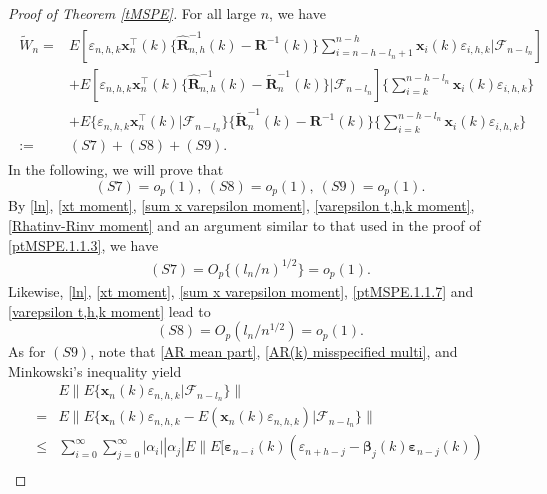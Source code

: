\documentclass[ejsv2]{imsart}
\theoremstyle{plain}
\theoremstyle{definition}
\theoremstyle{remark}
\begin{document}
\begin{proof}[Proof of Theorem \ref{tMSPE}]
{For all large $n$, we have
\begin{align}\label{ptMSPE.1.2.1}
\begin{split}
   \tilde{W}_n=  & E[\varepsilon_{n,h,k}\mathbf{x}^\top_n(k)\{\hat{\mathbf{R}}_{n,h}^{-1}(k)-\mathbf{R}^{-1}(k)\}\sum_{i=n-h-l_n+1}^{n-h}\mathbf{x}_i(k)\varepsilon_{i,h,k}|\mathcal{F}_{n-l_n}] \\
   &+E[\varepsilon_{n,h,k}\mathbf{x}^\top_n(k)\{\hat{\mathbf{R}}_{n,h}^{-1}(k)-\tilde{\mathbf{R}}_n^{-1}(k)\}|\mathcal{F}_{n-l_n}]\{\sum_{i=k}^{n-h-l_n}\mathbf{x}_i(k)\varepsilon_{i,h,k}\} \\
    &+E\{\varepsilon_{n,h,k}\mathbf{x}^\top_n(k)|\mathcal{F}_{n-l_n}\}\{\tilde{\mathbf{R}}_n^{-1}(k)-\mathbf{R}^{-1}(k)\}\{\sum_{i=k}^{n-h-l_n}\mathbf{x}_i(k)\varepsilon_{i,h,k}\}\\
    :=&(S7)+(S8)+(S9).
\end{split}
\end{align}
In the following, we will prove that
\begin{equation}\label{ptMSPE.S7-S9}
    (S7)=o_p(1),\ (S8)=o_p(1),\ (S9)=o_p(1).
\end{equation}
By \eqref{ln}, \eqref{xt moment}, \eqref{sum x varepsilon moment}, \eqref{varepsilon t,h,k moment}, \eqref{Rhatinv-Rinv moment} and an argument similar to that used in the proof of \eqref{ptMSPE.1.1.3}, we have
\begin{equation}\label{ptMSPE.1.2.2}
\begin{split}
    (S7)=O_p\{(l_n/n)^{1/2}\}=o_p(1).
\end{split}
\end{equation}
Likewise, \eqref{ln}, \eqref{xt moment}, \eqref{sum x varepsilon moment}, \eqref{ptMSPE.1.1.7} and \eqref{varepsilon t,h,k moment} lead to
\begin{equation}\label{ptMSPE.1.2.3}
(S8)=O_p(l_n/n^{1/2})=o_p(1).
\end{equation}
As for $(S9)$, note that \eqref{AR mean part}, \eqref{AR(k) misspecified multi}, and Minkowski's inequality yield
\begin{equation}\label{ptMSPE.1.2.3.1}
\begin{split}
     & E\lVert E\{\mathbf{x}_n(k)\varepsilon_{n,h,k}|\mathcal{F}_{n-l_n}\}\rVert\\
     =&E\lVert E\{\mathbf{x}_n(k)\varepsilon_{n,h,k}-E(\mathbf{x}_n(k)\varepsilon_{n,h,k})|\mathcal{F}_{n-l_n}\}\rVert\\
    \leq & \sum_{i=0}^{\infty}\sum_{j=0}^{\infty}|\alpha_i||\alpha_j|E\lVert E[\bm{\varepsilon}_{n-i}(k)(\varepsilon_{n+h-j}-\bm{\beta}_j(k)\bm{\varepsilon}_{n-j}(k))\\

\end{split}
\end{equation}}
\end{proof}
\end{document}

